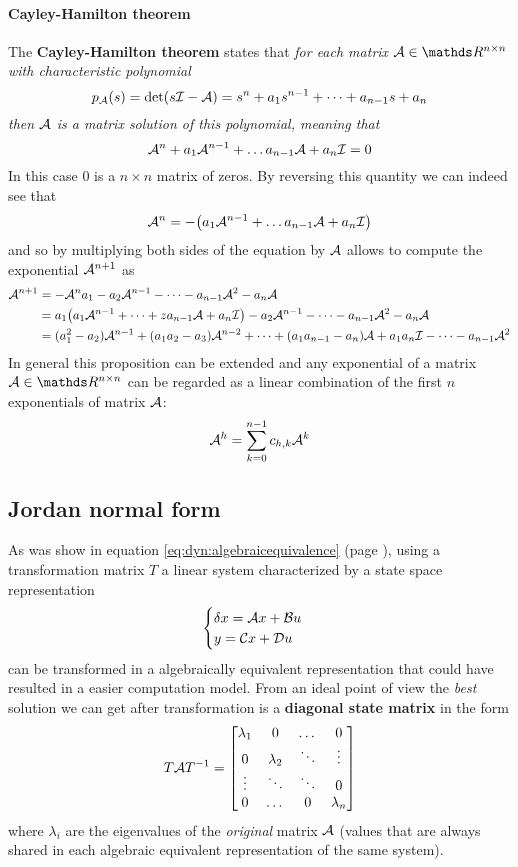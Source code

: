 	\paragraph{Cayley-Hamilton theorem} The \textbf{Cayley-Hamilton theorem} states that { \itshape for each matrix $\A \in \mathds R^{n\times n}$ with characteristic polynomial
	\[ p_{\mathcal{A}}(s) = \det (s\mathcal{I} -\mathcal{A}) = s^n + a_1 s^{n-1} + \dots + a_{n-1} s + a_n \] then  $\mathcal{A}$ is a matrix solution of this polynomial, meaning that
	\[ \mathcal{A}^n + a_1 \mathcal{A}^{n-1} + \dots a_{n-1} \mathcal{A} + a_n \mathcal{I} = 0 \] }
	In this case $0$ is a $n\times n$ matrix of zeros. By reversing this quantity we can indeed see that
	\[ \mathcal{A}^n = - \big( a_1 \mathcal{A}^{n-1} + \dots a_{n-1} \mathcal{A} + a_n \mathcal{I} \big) \]
	and so by multiplying both sides of the equation by $\mathcal{A}$ allows to compute the exponential $\mathcal{A}^{n+1}$ as
	\begin{align*}
		\mathcal{A}^{n+1} & = -\mathcal{A}^n a_1 - a_2 \mathcal{A}^{n-1} - \dots - a_{n-1}\mathcal{A}^2 - a_n \mathcal{A}  \\
		& = a_1\big(a_1 \mathcal{A}^{n-1} + \dots + za_{n-1} \mathcal{A} + a_n \mathcal{I} \big) - a_2 \mathcal{A}^{n-1} - \dots - a_{n-1}\mathcal{A}^2 - a_n \mathcal{A} \\
		& = (a_1^2 - a_2) \mathcal{A}^{n-1} + (a_1 a_2 - a_3) \mathcal{A}^{n-2} + \dots + (a_1 a_{n-1} - a_n) \mathcal{A} + a_1 a_n \mathcal{I} - \dots -a_{n-1} \mathcal{A}^2
	\end{align*}
	In general this proposition can be extended and any exponential of a matrix $\A \in \mathds R^{n\times n}$ can be regarded as a linear combination of the first $n$ exponentials of matrix $\mathcal{A}$:
	\begin{equation}
		\mathcal{A}^h = \sum_{k=0}^{n-1} c_{h,k} \mathcal{A}^k
	\end{equation}

	\subsection{Jordan normal form}
		As was show in equation \ref{eq:dyn:algebraicequivalence} (page \pageref{eq:dyn:algebraicequivalence}), using a transformation matrix $T$ a linear system characterized by a state space representation
		\[ \begin{cases}
			\delta x = \mathcal{A} x + \mathcal{B} u \\ y = \mathcal{C} x + \mathcal{D} u
		\end{cases} \]
		can be transformed in a algebraically equivalent representation that could have resulted in a easier computation model. From an ideal point of view the \textit{best} solution we can get after transformation is a \textbf{diagonal state matrix} in the form
		\[ T \mathcal{A} T^{-1} = \begin{bmatrix}  \lambda_1 & 0 & \dots & 0 \\
		0 & \lambda_2 & \ddots  & \vdots \\ 
		\vdots & \ddots & \ddots & 0 \\
		0 & \dots & 0 & \lambda_n  \end{bmatrix} \]
		where $\lambda_i$ are the eigenvalues of the \textit{original} matrix $\mathcal{A}$ (values that are always shared in each algebraic equivalent representation of the same system).
		
